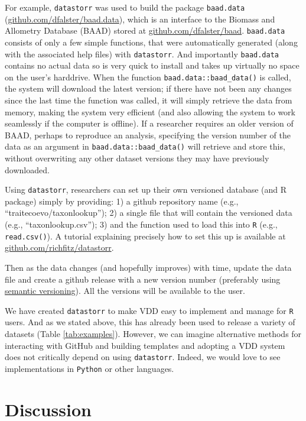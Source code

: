 \documentclass[a4paper,11pt]{article}
\newcommand{\smurl}[1]{{\footnotesize\url{#1}}}
\begin{document}
For example, \texttt{datastorr} was used to build the package \texttt{baad.data} (\smurl{github.com/dfalster/baad.data}), which is an interface to the Biomass and Allometry Database (BAAD) stored at \smurl{github.com/dfalster/baad}. \texttt{baad.data} consists of only a few simple functions, that were automatically generated (along with the associated help files) with \texttt{datastorr}. And importantly \texttt{baad.data} contains no actual data so is very quick to install and takes up virtually no space on the user's harddrive. When the function \texttt{baad.data::baad\_data()} is called, the system will download the latest version; if there have not been any changes since the last time the function was called, it will simply retrieve the data from memory, making the system very efficient (and also allowing the system to work seamlessly if the computer is offline). If a researcher requires an older version of BAAD, perhaps to reproduce an analysis, specifying the version number of the data as an argument in \texttt{baad.data::baad\_data()} will retrieve and store this, without overwriting any other dataset versions they may have previously downloaded.

Using \texttt{datastorr}, researchers can set up their own versioned database (and R package) simply by providing: 1) a github repository name (e.g., ``traitecoevo/taxonlookup''); 2) a single file that will contain the versioned data (e.g., ``taxonlookup.csv''); 3) and the function used to load this into \texttt{R} (e.g., \texttt{read.csv()}). A tutorial explaining precisely how to set this up is available at \smurl{github.com/richfitz/datastorr}. %

Then as the data changes (and hopefully improves) with time, update the data
file and create a github release with a new version number (preferably
using \href{http://semver.org/}{semantic versioning}). All the versions
will be available to the user. 

We have created \texttt{datastorr} to make VDD easy to implement and manage for \texttt{R} users. And as we stated above, this has already been used to release a variety of datasets (Table \ref{tab:examples}). However, we can imagine alternative methods for interacting with GitHub and building templates and adopting a VDD system does not critically depend on using \texttt{datastorr}. Indeed, we would love to see implementations in \texttt{Python} or other languages.

\section{Discussion}
\end{document}
